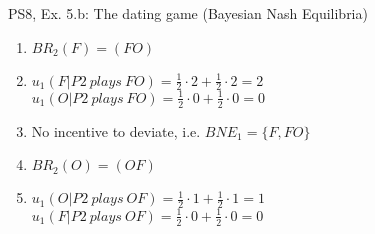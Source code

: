 \begin{frame}{PS8, Ex. 5.b: The dating game (Bayesian Nash Equilibria)}
\begin{multicols}{2}
\begin{enumerate}
        \item[1.a:] $BR_2(F)=(FO)$
        \item[1.b:] $u_1(F|P2\ plays\ FO)=\frac{1}{2}\cdot2+\frac{1}{2}\cdot2=2$\\
                    $u_1(O|P2\ plays\ FO)=\frac{1}{2}\cdot0+\frac{1}{2}\cdot0=0$
        \item[1.c:] No incentive to deviate, i.e. $BNE_1=\{F,FO\}$
        \item[2.a:] $BR_2(O)=(OF)$
        \item[2.b:] $u_1(O|P2\ plays\ OF)=\frac{1}{2}\cdot1+\frac{1}{2}\cdot1=1$\\
                    $u_1(F|P2\ plays\ OF)=\frac{1}{2}\cdot0+\frac{1}{2}\cdot0=0$
      \end{enumerate}
      \vfill\null
    \end{multicols}
\end{frame}
